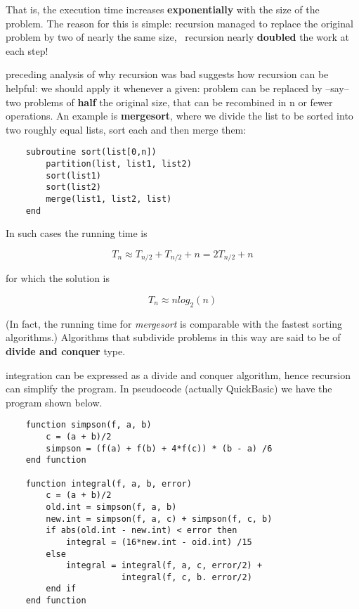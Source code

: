 That is, the execution time increases \textbf{exponentially} with the size of the problem. The reason for this is simple: recursion managed to replace the original problem by two of nearly the same size, \ie\ recursion nearly \textbf{doubled} the work at each step!

 preceding analysis of why recursion was bad suggests how recursion can be helpful: we should apply it whenever a given: problem can be replaced by --say-- two problems of \textbf{half} the original size, that can be recombined in n or fewer operations. An example is \textbf{mergesort}, where we divide the list to be sorted into two roughly equal lists, sort each and then merge them:

\begin{verbatim}
    subroutine sort(list[0,n])
        partition(list, list1, list2)
        sort(list1)
        sort(list2)
        merge(list1, list2, list)
    end
\end{verbatim}

In such cases the running time is

\begin{equation}
T_{n} \approx T_{n/2} + T_{n/2} + n = 2T_{n/2} + n
\end{equation}

for which the solution is

\begin{equation}
T_{n} \approx n log_2 (n)
\end{equation}

(In fact, the running time for \textit{mergesort} is comparable with the fastest sorting algorithms.) Algorithms that subdivide problems in this way are said to be of \textbf{divide and conquer} type.

 integration can be expressed as a divide and conquer algorithm, hence recursion can simplify the program. In pseudocode (actually QuickBasic\textsuperscript{\textregistered}) we have the program shown
below.

\begin{verbatim}
    function simpson(f, a, b)
        c = (a + b)/2
        simpson = (f(a) + f(b) + 4*f(c)) * (b - a) /6
    end function

    function integral(f, a, b, error)
        c = (a + b)/2
        old.int = simpson(f, a, b)
        new.int = simpson(f, a, c) + simpson(f, c, b)
        if abs(old.int - new.int) < error then
            integral = (16*new.int - oid.int) /15
        else
            integral = integral(f, a, c, error/2) +
                       integral(f, c, b. error/2)
        end if
    end function
\end{verbatim}

